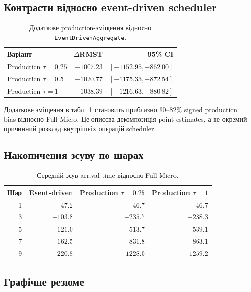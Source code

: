 \documentclass[11pt,a4paper]{article}
\begin{document}
\subsection{Контрасти відносно event-driven scheduler}

\begin{table}[H]
\centering
\caption{Додаткове production-зміщення відносно
\texttt{EventDrivenAggregate}.}
\label{tab:event}
\begin{tabular}{lrr}
\toprule
Варіант & $\Delta$RMST & 95\% CI \\
\midrule
Production $\tau=0.25$ & $-1007.23$ & $[-1152.95,-862.00]$ \\
Production $\tau=0.5$  & $-1020.77$ & $[-1175.33,-872.54]$ \\
Production $\tau=1$    & $-1038.39$ & $[-1216.63,-880.82]$ \\
\bottomrule
\end{tabular}
\end{table}

Додаткове зміщення в табл.~\ref{tab:event} становить приблизно 80--82\%
signed production bias відносно Full Micro. Це описова декомпозиція point
estimates, а не окремий причинний розклад внутрішніх операцій scheduler.

\subsection{Накопичення зсуву по шарах}

\begin{table}[H]
\centering
\caption{Середній зсув arrival time відносно Full Micro.}
\label{tab:layers}
\begin{tabular}{rrrr}
\toprule
Шар & Event-driven & Production $\tau=0.25$ & Production $\tau=1$ \\
\midrule
1 & $-47.2$  & $-46.7$   & $-46.7$ \\
3 & $-103.8$ & $-235.7$  & $-238.3$ \\
5 & $-121.0$ & $-513.7$  & $-539.1$ \\
7 & $-162.5$ & $-831.8$  & $-863.1$ \\
9 & $-220.8$ & $-1228.0$ & $-1259.2$ \\
\bottomrule
\end{tabular}
\end{table}

\subsection{Графічне резюме}
\end{document}
